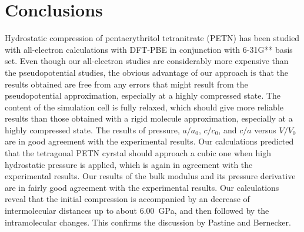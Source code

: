 \documentclass[prb,aps,nobibnotes,twocolumn,doublespace,twocolumngrid,superbib]{revtex4}
\begin{document}




\section{Conclusions}
\label{sec:conclusions}
Hydrostatic compression of pentaerythritol tetranitrate (PETN) has
been studied with all-electron calculations with DFT-PBE in
conjunction with 6-31G** basis set. Even though our all-electron 
studies are considerably more expensive than the pseudopotential
studies, the obvious advantage of our approach is that the results obtained are
free from any errors that might result from the pseudopotential approximation,
especially at a highly compressed state. 
The content of the simulation cell is fully relaxed, which should give more 
reliable results than those obtained with a rigid molecule approximation, 
especially at a highly compressed state.
The results of pressure, $a/a_0$, $c/c_0$, and $c/a$ versus 
$V/V_0$ are in good agreement with the experimental results. 
Our calculations predicted that the tetragonal PETN cyrstal should 
approach a cubic one when high hydrostatic pressure is applied, which is again
in agreement with the experimental results.
Our results of the bulk modulus and its pressure derivative are in fairly good
agreement with the experimental results.
Our calculations reveal that the initial compression is accompanied by
an decrease of intermolecular distances up to about 6.00~GPa, and then
followed by the intramolecular changes. This confirms the discussion
by Pastine and Bernecker\cite{Pastine_1974v45}.
\end{document}
